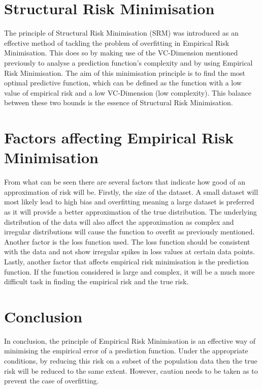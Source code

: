 \section{Structural Risk Minimisation}
The principle of Structural Risk Minimisation (SRM) was introduced as an effective method of tackling the problem of overfitting in Empirical Risk Minimisation. This does so by making use of the VC-Dimension mentioned previously to analyse a prediction function's complexity and by using Empirical Risk Minimisation. The aim of this minimisation principle is to find the most optimal predictive function, which can be defined as the function with a low value of empirical risk and a low VC-Dimension (low complexity). This balance between these two bounds is the essence of Structural Risk Minimisation.

\section{Factors affecting Empirical Risk Minimisation}

From what can be seen there are several factors that indicate how good of an approximation of risk will be. Firstly, the size of the dataset. A small dataset will most likely lead to high bias and overfitting meaning a large dataset is preferred as it will provide a better approximation of the true distribution. The underlying distribution of the data will also affect the approximation as complex and irregular distributions will cause the function to overfit as previously mentioned. Another factor is the loss function used. The loss function should be consistent with the data and not show irregular spikes in loss values at certain data points. Lastly, another factor that affects empirical risk minimisation is the prediction function. If the function considered is large and complex, it will be a much more difficult task in finding the empirical risk and the true risk. 

\section{Conclusion}
In conclusion, the principle of Empirical Risk Minimisation is an effective way of minimising the empirical error of a prediction function. Under the appropriate conditions, by reducing this risk on a subset of the population data then the true risk will be reduced to the same extent. However, caution needs to be taken as to prevent the case of overfitting.



